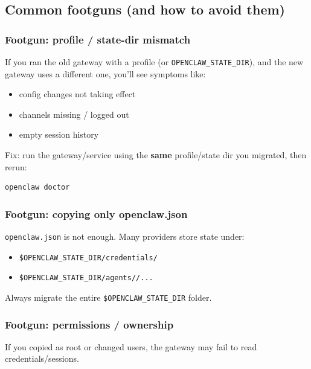\subsection{Common footguns (and how to avoid them)}


\subsubsection{Footgun: profile / state-dir mismatch}


If you ran the old gateway with a profile (or \texttt{OPENCLAW\_STATE\_DIR}), and the new gateway uses a different one, you’ll see symptoms like:

\begin{itemize}
  \item config changes not taking effect
  \item channels missing / logged out
  \item empty session history
\end{itemize}


Fix: run the gateway/service using the \textbf{same} profile/state dir you migrated, then rerun:

\begin{lstlisting}[language=bash]
openclaw doctor
\end{lstlisting}


\subsubsection{Footgun: copying only openclaw.json}


\texttt{openclaw.json} is not enough. Many providers store state under:

\begin{itemize}
  \item \texttt{\$OPENCLAW\_STATE\_DIR/credentials/}
  \item \texttt{\$OPENCLAW\_STATE\_DIR/agents//...}
\end{itemize}


Always migrate the entire \texttt{\$OPENCLAW\_STATE\_DIR} folder.

\subsubsection{Footgun: permissions / ownership}


If you copied as root or changed users, the gateway may fail to read credentials/sessions.

